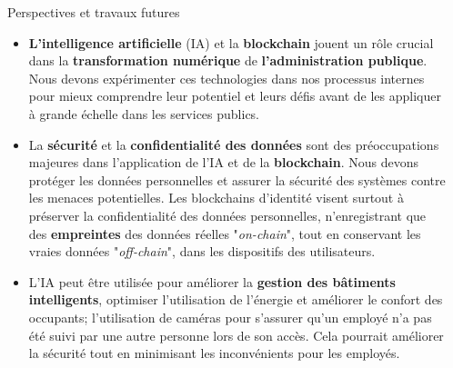 \documentclass[final]{beamer}
\newlength{\onecolwid}
\newlength{\twocolwid}
\begin{document}
\begin{frame}[t]
\begin{columns}[t]
\begin{column}{\twocolwid}
\begin{columns}[t,totalwidth=\twocolwid]
\begin{column}{\onecolwid}

\end{column} %


\begin{column}{\onecolwid} %



\begin{alertblock}{Perspectives et travaux futures}

\begin{itemize}

\item \textbf{L'intelligence artificielle} (IA) et la \textbf{blockchain} jouent un rôle crucial dans la \textbf{transformation numérique} de \textbf{l'administration publique}. Nous devons expérimenter ces technologies dans nos processus internes pour mieux comprendre leur potentiel et leurs défis avant de les appliquer à grande échelle dans les services publics. 

\item La \textbf{sécurité} et la \textbf{confidentialité des données} sont des préoccupations majeures dans l'application de {l'IA} et de la \textbf{blockchain}. Nous devons protéger les données personnelles et assurer la sécurité des systèmes contre les menaces potentielles. Les blockchains d'identité visent surtout à préserver la confidentialité des données personnelles, n'enregistrant que des \textbf{empreintes} des données réelles "\textit{on-chain}", tout en conservant les vraies données "\textit{off-chain}", dans les dispositifs des utilisateurs. 

\item L'IA peut être utilisée pour améliorer la \textbf{gestion des bâtiments intelligents}, optimiser l'utilisation de l'énergie et améliorer le confort des occupants; l'utilisation de caméras pour s'assurer qu'un employé n'a pas été suivi par une autre personne lors de son accès. Cela pourrait améliorer la sécurité tout en minimisant les inconvénients pour les employés.


\end{itemize}
\end{alertblock}
\end{column}
\end{columns}
\end{column}
\end{columns}
\end{frame}
\end{document}

